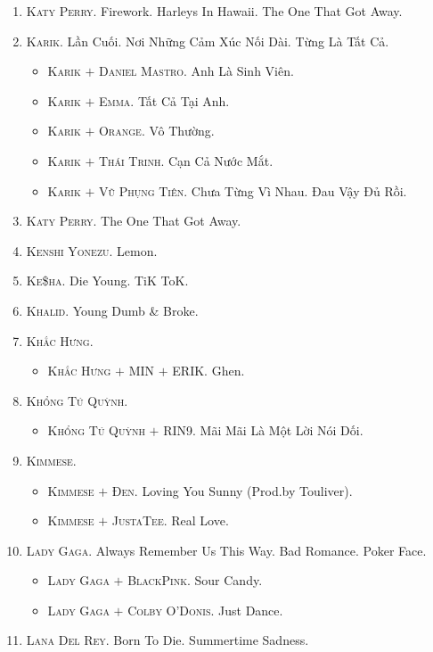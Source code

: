 \documentclass{article}
\begin{document}
\begin{enumerate}
	\item \textsc{Katy Perry.} Firework. Harleys In Hawaii. The One That Got Away.
	\item \textsc{Karik.} Lần Cuối. Nơi Những Cảm Xúc Nối Dài. Từng Là Tất Cả.
	\begin{itemize}
		\item \textsc{Karik $+$ Daniel Mastro.} Anh Là Sinh Viên.
		\item \textsc{Karik $+$ Emma.} Tất Cả Tại Anh.
		\item \textsc{Karik $+$ Orange.} Vô Thường.
		\item \textsc{Karik $+$ Thái Trinh.} Cạn Cả Nước Mắt.
		\item \textsc{Karik $+$ Vũ Phụng Tiên.} Chưa Từng Vì Nhau. Đau Vậy Đủ Rồi.
	\end{itemize}	
	\item \textsc{Katy Perry.} The One That Got Away.
	\item \textsc{Kenshi Yonezu.} Lemon.
	\item \textsc{Ke\$ha.} Die Young. TiK ToK.
	\item \textsc{Khalid.} Young Dumb \& Broke.
	\item \textsc{Khắc Hưng.}
	\begin{itemize}
		\item \textsc{Khắc Hưng $+$ MIN $+$ ERIK.} Ghen.
	\end{itemize}
	\item \textsc{Khổng Tú Quỳnh.}
	\begin{itemize}
		\item \textsc{Khổng Tú Quỳnh $+$ RIN9.} Mãi Mãi Là Một Lời Nói Dối.
	\end{itemize}
	\item \textsc{Kimmese.}
	\begin{itemize}
		\item \textsc{Kimmese $+$ Đen.} Loving You Sunny (Prod.by Touliver).
		\item \textsc{Kimmese $+$ JustaTee.} Real Love.
	\end{itemize}
	\item \textsc{Lady Gaga.} Always Remember Us This Way. Bad Romance. Poker Face.
	\begin{itemize}
		\item \textsc{Lady Gaga $+$ BlackPink.} Sour Candy.
		\item \textsc{Lady Gaga $+$ Colby O'Donis.} Just Dance.
	\end{itemize}
	\item \textsc{Lana Del Rey.} Born To Die. Summertime Sadness.

\end{enumerate}
\end{document}
